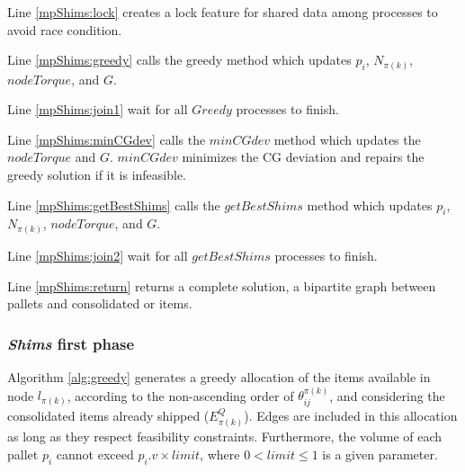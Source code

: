 \documentclass[preprint,authoryear]{elsarticle}
\begin{document}
Line \ref{mpShims:lock} creates a lock feature for shared data among processes to avoid race condition.

Line \ref{mpShims:greedy} calls the greedy method which updates $p_i$, $N_{\pi(k)}$, $nodeTorque$, and $G$.

Line \ref{mpShims:join1} wait for all $Greedy$ processes to finish.

Line \ref{mpShims:minCGdev} calls the $minCGdev$ method which updates the $nodeTorque$ and $G$. $minCGdev$ minimizes the CG deviation and repairs the greedy solution if it is infeasible.

Line \ref{mpShims:getBestShims} calls the $getBestShims$ method which updates $p_i$, $N_{\pi(k)}$, $nodeTorque$, and $G$.

Line \ref{mpShims:join2} wait for all $getBestShims$ processes to finish.

Line \ref{mpShims:return} returns a complete solution, a bipartite graph between pallets and consolidated or items.

\subsubsection{{\it Shims} first phase}


Algorithm \ref{alg:greedy} generates a greedy allocation of the items available in node $l_{\pi(k)}$, according to the non-ascending order of $\theta^{\pi(k)}_{ij}$, and considering the consolidated items already shipped ($E^Q_{\pi(k)}$). Edges are included in this allocation as long as they respect feasibility constraints. Furthermore, the volume of each pallet $p_i$\/ cannot exceed $p_i.v \times limit$, where $ 0 < limit \leq 1$\/ is a given parameter.
\end{document}
